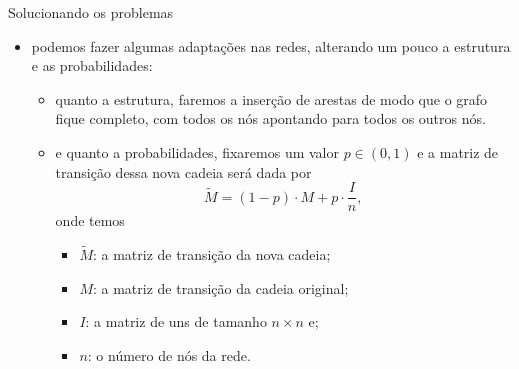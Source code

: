 \documentclass{beamer}
\begin{document}
\begin{frame}{Solucionando os problemas}
\begin{itemize}


\item podemos fazer algumas adaptações nas redes, alterando um pouco a estrutura e as probabilidades:

\vspace{8pt}

\begin{itemize}
    \item quanto a estrutura, faremos a inserção de arestas de modo que o grafo fique completo, com todos os nós apontando para todos os outros nós.
    
    \vspace{5pt}
    
    \item e quanto a probabilidades, fixaremos um valor $p\in (0, 1)$ e a matriz de transição dessa nova cadeia será dada por
\[\tilde{M} = (1 - p)\cdot M + p\cdot \dfrac{I}{n},\] 
onde temos

\begin{itemize}
    \item $\tilde{M}$: a matriz de transição da nova cadeia;
        
    \item $M$: a matriz de transição da cadeia original;
        
    \item $I$: a matriz de uns de tamanho $n\times n$ e;
        
    \item $n$: o número de nós da rede.
\end{itemize}

\end{itemize}


\end{itemize}
\end{frame}
\end{document}
